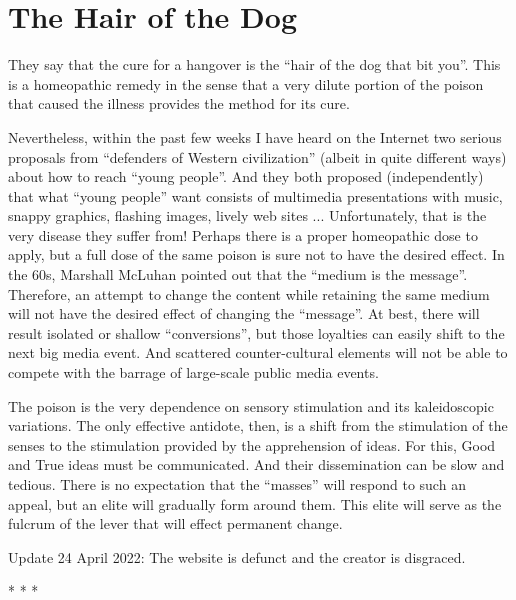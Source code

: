 \section{The Hair of the Dog}

They say that the cure for a hangover is the ``hair of the dog that bit you''. This is a homeopathic remedy in the sense that a very dilute portion of the poison that caused the illness provides the method for its cure.

Nevertheless, within the past few weeks I have heard on the Internet two serious proposals from ``defenders of Western civilization'' (albeit in quite different ways) about how to reach ``young people''. And they both proposed (independently) that what ``young people'' want consists of multimedia presentations with music, snappy graphics, flashing images, lively web sites ... Unfortunately, that is the very disease they suffer from! Perhaps there is a proper homeopathic dose to apply, but a full dose of the same poison is sure not to have the desired effect. In the 60s, Marshall McLuhan pointed out that the ``medium is the message''. Therefore, an attempt to change the content while retaining the same medium will not have the desired effect of changing the ``message''. At best, there will result isolated or shallow ``conversions'', but those loyalties can easily shift to the next big media event. And scattered counter-cultural elements will not be able to compete with the barrage of large-scale public media events.

The poison is the very dependence on sensory stimulation and its kaleidoscopic variations. The only effective antidote, then, is a shift from the stimulation of the senses to the stimulation provided by the apprehension of ideas. For this, Good and True ideas must be communicated. And their dissemination can be slow and tedious. There is no expectation that the ``masses'' will respond to such an appeal, but an elite will gradually form around them. This elite will serve as the fulcrum of the lever that will effect permanent change.

Update 24 April 2022: The website is defunct and the creator is disgraced.



\begin{center}* * *\end{center}

